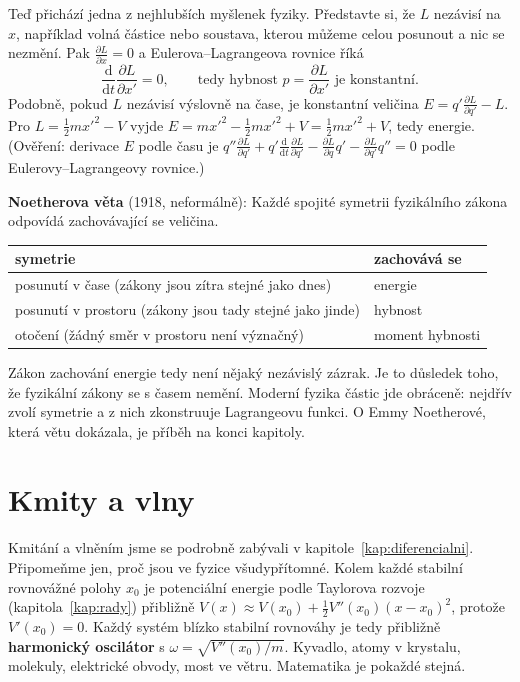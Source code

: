Teď přichází jedna z nejhlubších myšlenek fyziky. Představte si, že $L$ nezávisí na $x$, například volná částice nebo soustava, kterou můžeme celou posunout a nic se nezmění. Pak $\frac{\partial L}{\partial x} = 0$ a Eulerova--Lagrangeova rovnice říká
\begin{equation*}
  \frac{\mathrm{d}}{\mathrm{d}t}\frac{\partial L}{\partial x'} = 0,\qquad\text{tedy hybnost } p = \frac{\partial L}{\partial x'}\text{ je konstantní.}
\end{equation*}
Podobně, pokud $L$ nezávisí výslovně na čase, je konstantní veličina $E = q'\frac{\partial L}{\partial q'} - L$. Pro $L = \frac{1}{2}mx'^2 - V$ vyjde $E = mx'^2 - \frac{1}{2}mx'^2 + V = \frac{1}{2}mx'^2 + V$, tedy energie. (Ověření: derivace $E$ podle času je $q''\frac{\partial L}{\partial q'} + q'\frac{\mathrm{d}}{\mathrm{d}t}\frac{\partial L}{\partial q'} - \frac{\partial L}{\partial q}q' - \frac{\partial L}{\partial q'}q'' = 0$ podle Eulerovy--Lagrangeovy rovnice.)

\begin{definitionbox}
  \textbf{Noetherova věta} (1918, neformálně): Každé spojité symetrii fyzikálního zákona odpovídá zachovávající se veličina.
  \begin{center}
    \begin{tabular}{l|l}
      symetrie & zachovává se\\\hline
      posunutí v čase (zákony jsou zítra stejné jako dnes) & energie\\
      posunutí v prostoru (zákony jsou tady stejné jako jinde) & hybnost\\
      otočení (žádný směr v prostoru není význačný) & moment hybnosti
    \end{tabular}
  \end{center}
\end{definitionbox}

Zákon zachování energie tedy není nějaký nezávislý zázrak. Je to důsledek toho, že fyzikální zákony se s časem nemění. Moderní fyzika částic jde obráceně: nejdřív zvolí symetrie a z nich zkonstruuje Lagrangeovu funkci. O Emmy Noetherové, která větu dokázala, je příběh na konci kapitoly.

\section{Kmity a vlny}

Kmitání a vlněním jsme se podrobně zabývali v kapitole~\ref{kap:diferencialni}. Připomeňme jen, proč jsou ve fyzice všudypřítomné. Kolem každé stabilní rovnovážné polohy $x_0$ je potenciální energie podle Taylorova rozvoje (kapitola~\ref{kap:rady}) přibližně $V(x)\approx V(x_0) + \frac{1}{2}V''(x_0){(x - x_0)}^2$, protože $V'(x_0) = 0$. Každý systém blízko stabilní rovnováhy je tedy přibližně \textbf{harmonický oscilátor} s $\omega = \sqrt{V''(x_0)/m}$. Kyvadlo, atomy v krystalu, molekuly, elektrické obvody, most ve větru. Matematika je pokaždé stejná.

